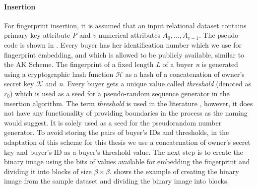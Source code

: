\paragraph{Insertion}
For fingerprint insertion, it is assumed that an input relational dataset contains primary key attribute \textit{P} and $v$ numerical attributes $A_0,...,A_{v-1}$.
The pseudo-code is shown in .
Every buyer has her identification number which we use for fingerprint embedding, and which is allowed to be publicly available, similar to the AK Scheme. 
The fingerprint of a fixed length \textit{L} of a buyer \textit{n} is generated using a cryptographic hash function $\mathcal{H}$ as a hash of a concatenation of owner's secret key $\mathcal{K}$ and \textit{n}.
Every buyer gets a unique value called \textit{threshold} (denoted as $r_0$) which is used as a seed for a pseudo-random sequence generator in the insertion algorithm.
The term \textit{threshold} is used in the literature \cite{liu2004block}, however, it does not have any functionality of providing boundaries in the process as the naming would suggest. 
It is solely used as a seed for the pseudorandom number generator. 
To avoid storing the pairs of buyer's IDs and thresholds, in the adaptation of this scheme for this thesis we use a concatenation of owner's secret key and buyer's ID as a buyer's threshold value. 
The next step is to create the binary image using the bits of values available for embedding the fingerprint and dividing it into blocks of size $\beta \times \beta$.
 shows the example of creating the binary image from the sample dataset and dividing the binary image into blocks. 

